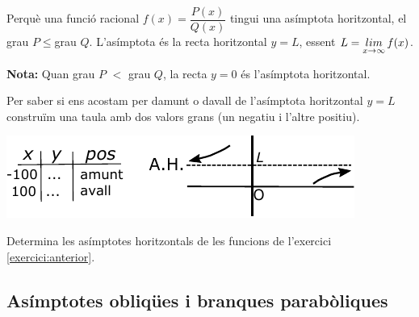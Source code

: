 \begin{theorybox}
	Perquè una funció racional $f(x)=\dfrac{P(x)}{Q(x)}$ tingui una asímptota horitzontal, \newline el grau $P\leq $grau $Q$. L'asímptota és la recta horitzontal $y=L$, essent $L=\mathop{lim}\limits_{x\to \infty }f(x)$.
		\vspace{0.25cm}
	
	\begin{center}
		\textbf{Nota:} Quan grau $P$ $<$ grau $Q$, la recta $y=0$ és l'asímptota horitzontal.
	\end{center}
	\vspace{0.25cm}
	
	\begin{minipage}{0.45\textwidth}
		Per saber si ens acostam per damunt o davall de l'asímptota horitzontal $y=L$ construïm una taula amb dos valors grans (un negatiu i l'altre positiu).
	\end{minipage}
	\begin{minipage}{0.55\textwidth}
		\begin{center}
			\includegraphics[width=\textwidth]{img-06/asimptota-horitzontal}
		\end{center}
		
	\end{minipage}
	
\end{theorybox}
 

\begin{mylist}
\exer  Determina  les asímptotes horitzontals de les funcions  de l'exercici \ref{exercici:anterior}.

\answers{[$y=1$, $y=3$, $y=1$, $y=0$]}
\end{mylist}
 
 
\pagebreak
 
\subsection{Asímptotes obliqües i branques parabòliques}

